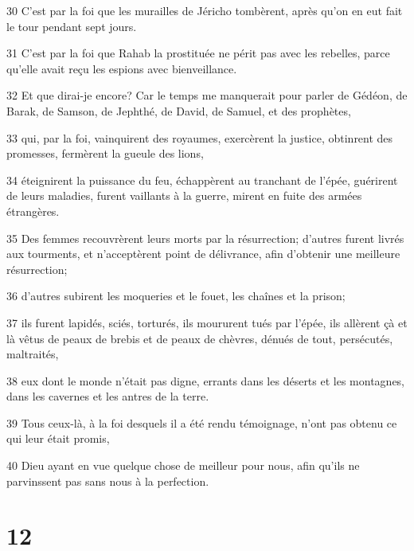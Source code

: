 \par 30 C'est par la foi que les murailles de Jéricho tombèrent, après qu'on en eut fait le tour pendant sept jours.
\par 31 C'est par la foi que Rahab la prostituée ne périt pas avec les rebelles, parce qu'elle avait reçu les espions avec bienveillance.
\par 32 Et que dirai-je encore? Car le temps me manquerait pour parler de Gédéon, de Barak, de Samson, de Jephthé, de David, de Samuel, et des prophètes,
\par 33 qui, par la foi, vainquirent des royaumes, exercèrent la justice, obtinrent des promesses, fermèrent la gueule des lions,
\par 34 éteignirent la puissance du feu, échappèrent au tranchant de l'épée, guérirent de leurs maladies, furent vaillants à la guerre, mirent en fuite des armées étrangères.
\par 35 Des femmes recouvrèrent leurs morts par la résurrection; d'autres furent livrés aux tourments, et n'acceptèrent point de délivrance, afin d'obtenir une meilleure résurrection;
\par 36 d'autres subirent les moqueries et le fouet, les chaînes et la prison;
\par 37 ils furent lapidés, sciés, torturés, ils moururent tués par l'épée, ils allèrent çà et là vêtus de peaux de brebis et de peaux de chèvres, dénués de tout, persécutés, maltraités,
\par 38 eux dont le monde n'était pas digne, errants dans les déserts et les montagnes, dans les cavernes et les antres de la terre.
\par 39 Tous ceux-là, à la foi desquels il a été rendu témoignage, n'ont pas obtenu ce qui leur était promis,
\par 40 Dieu ayant en vue quelque chose de meilleur pour nous, afin qu'ils ne parvinssent pas sans nous à la perfection.

\chapter{12}


